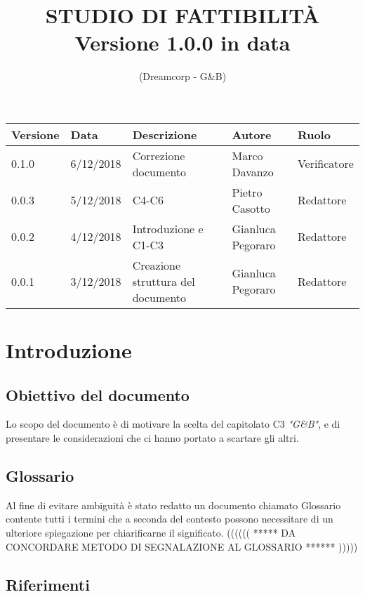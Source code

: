 
\title{\textbf{STUDIO DI FATTIBILITÀ}
    \\{\Large Versione 1.0.0 in data }}
\author{(Dreamcorp - G\&B)}


\maketitle
\newpage


\begin{tabularx}{\textwidth}{|X|X|X|X|X|}
    \hline
    \textbf{Versione} & \textbf{Data} & \textbf{Descrizione} & \textbf{Autore} & \textbf{Ruolo}\\
    \hline
    0.1.0 & 6/12/2018 & Correzione documento & Marco Davanzo & Verificatore \\
    \hline
    0.0.3 & 5/12/2018 & C4-C6 & Pietro Casotto & Redattore \\
    \hline
    0.0.2 & 4/12/2018 & Introduzione e C1-C3 & Gianluca Pegoraro & Redattore \\
    \hline
    0.0.1 & 3/12/2018 & Creazione struttura del documento & Gianluca Pegoraro & Redattore  \\
    \hline
\end{tabularx}


\newpage




\section{Introduzione}
    \subsection{Obiettivo del documento}
    Lo scopo del documento è di motivare la scelta del capitolato C3 \textit{"G\&B"}, e di presentare le    considerazioni che ci hanno portato a scartare gli altri.
    \subsection{Glossario}
        Al fine di evitare ambiguità è stato redatto un documento chiamato Glossario contente tutti i termini che a seconda del contesto possono necessitare di un ulteriore spiegazione per chiarificarne il   significato. ((((((  *****   DA CONCORDARE METODO DI SEGNALAZIONE AL GLOSSARIO ******   ))))) 
    \subsection{Riferimenti}
